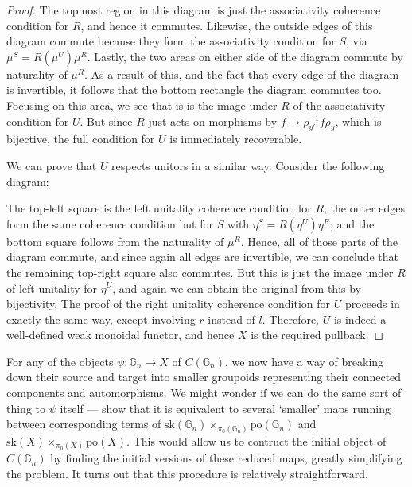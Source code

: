 \begin{proof}
The topmost region in this diagram is just the associativity coherence condition for $R$, and hence it commutes. Likewise, the outside edges of this diagram commute because they form the associativity condition for $S$, via $\mu^S = R(\mu^U) \mu^R$. Lastly, the two areas on either side of the diagram commute by naturality of $\mu^R$. As a result of this, and the fact that every edge of the diagram is invertible, it follows that the bottom rectangle the diagram commutes too. Focusing on this area, we see that is is the image under $R$ of the associativity condition for $U$. But since $R$ just acts on morphisms by $f \mapsto \rho_{y'}^{-1} f \rho_y$, which is bijective, the full condition for $U$ is immediately recoverable. 

We can prove that $U$ respects unitors in a similar way. Consider the following diagram:
\begin{eq*}  \end{eq*}
The top-left square is the left unitality coherence condition for $R$; the outer edges form the same coherence condition but for $S$ with $\eta^S = R(\eta^U) \eta^R$; and the bottom square follows from the naturality of $\mu^R$. Hence, all of those parts of the diagram commute, and since again all edges are invertible, we can conclude that the remaining top-right square also commutes. But this is just the image under $R$ of left unitality for $\eta^U$, and again we can obtain the original from this by bijectivity. The proof of the right unitality coherence condition for $U$ proceeds in exactly the same way, except involving $r$ instead of $l$. Therefore, $U$ is indeed a well-defined weak monoidal functor, and hence $X$ is the required pullback.
\end{proof}

For any of the objects $\psi : \mathbb{G}_n \to X$ of $C(\mathbb{G}_n)$, we now have a way of breaking down their source and target into smaller groupoids representing their connected components and automorphisms. We might wonder if we can do the same sort of thing to $\psi$ itself --- show that it is equivalent to several `smaller' maps running between corresponding terms of $\mathrm{sk}(\mathbb{G}_n) \times_{\pi_0(\mathbb{G}_n)} \mathrm{po}(\mathbb{G}_n)$ and $\mathrm{sk}(X) \times_{\pi_0(X)} \mathrm{po}(X)$. This would allow us to contruct the initial object of $C(\mathbb{G}_n)$ by finding the initial versions of these reduced maps, greatly simplifying the problem. It turns out that this procedure is relatively straightforward.

